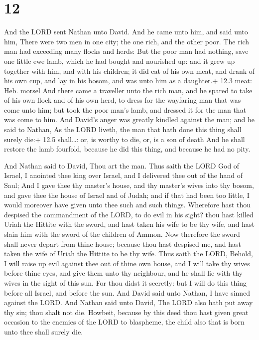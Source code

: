\hypertarget{section-11}{%
\section{12}\label{section-11}}

 And the LORD sent Nathan unto David. And he came unto him,
and said unto him, There were two men in one city; the one rich, and the
other poor.  The rich man had exceeding many flocks and
herds:  But the poor man had nothing, save one little ewe
lamb, which he had bought and nourished up: and it grew up together with
him, and with his children; it did eat of his own meat, and drank of his
own cup, and lay in his bosom, and was unto him as a daughter.+ 12.3
meat: Heb. morsel  And there came a traveller unto the rich
man, and he spared to take of his own flock and of his own herd, to
dress for the wayfaring man that was come unto him; but took the poor
man's lamb, and dressed it for the man that was come to him.
 And David's anger was greatly kindled against the man; and
he said to Nathan, As the LORD liveth, the man that hath done this thing
shall surely die:+ 12.5 shall\ldots: or, is worthy to die, or, is a son
of death  And he shall restore the lamb fourfold, because he
did this thing, and because he had no pity.

 And Nathan said to David, Thou art the man. Thus saith
the LORD God of Israel, I anointed thee king over Israel, and I
delivered thee out of the hand of Saul;  And I gave thee thy
master's house, and thy master's wives into thy bosom, and gave thee the
house of Israel and of Judah; and if that had been too little, I would
moreover have given unto thee such and such things. 
Wherefore hast thou despised the commandment of the LORD, to do evil in
his sight? thou hast killed Uriah the Hittite with the sword, and hast
taken his wife to be thy wife, and hast slain him with the sword of the
children of Ammon.  Now therefore the sword shall never
depart from thine house; because thou hast despised me, and hast taken
the wife of Uriah the Hittite to be thy wife.  Thus saith
the LORD, Behold, I will raise up evil against thee out of thine own
house, and I will take thy wives before thine eyes, and give them unto
thy neighbour, and he shall lie with thy wives in the sight of this sun.
 For thou didst it secretly: but I will do this thing
before all Israel, and before the sun.  And David said unto
Nathan, I have sinned against the LORD. And Nathan said unto David, The
LORD also hath put away thy sin; thou shalt not die. 
Howbeit, because by this deed thou hast given great occasion to the
enemies of the LORD to blaspheme, the child also that is born unto thee
shall surely die.

